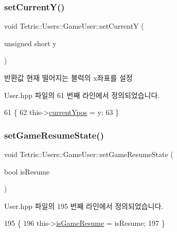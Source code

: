 \subsubsection{\texorpdfstring{set\+Current\+Y()}{setCurrentY()}\hspace{0.1cm}{\footnotesize\ttfamily [2/2]}}
{\footnotesize\ttfamily void Tetris\+::\+Users\+::\+Game\+User\+::set\+CurrentY (\begin{DoxyParamCaption}\item[{unsigned short}]{y }\end{DoxyParamCaption})\hspace{0.3cm}{\ttfamily [inline]}}

\begin{DoxyReturn}{반환값}
현재 떨어지는 블럭의 x좌표를 설정 
\end{DoxyReturn}


User.\+hpp 파일의 61 번째 라인에서 정의되었습니다.


\begin{DoxyCode}
61                                                   \{
62                     this->\hyperlink{class_tetris_1_1_users_1_1_game_user_ac1d5e4a4f73eb8502faae95d7958d83e}{currentYpos} = y;
63                 \}
\end{DoxyCode}
\mbox{\label{class_tetris_1_1_users_1_1_game_user_a10d5ff75a132346fd1947ea14bcea7ab}} 
\subsubsection{\texorpdfstring{set\+Game\+Resume\+State()}{setGameResumeState()}}
{\footnotesize\ttfamily void Tetris\+::\+Users\+::\+Game\+User\+::set\+Game\+Resume\+State (\begin{DoxyParamCaption}\item[{bool}]{is\+Resume }\end{DoxyParamCaption})\hspace{0.3cm}{\ttfamily [inline]}}



User.\+hpp 파일의 195 번째 라인에서 정의되었습니다.


\begin{DoxyCode}
195                                                   \{
196                 this->\hyperlink{class_tetris_1_1_users_1_1_game_user_a7f1389568b9af1e543a54bedd2e39ffc}{isGameResume} = isResume;
197             \}
\end{DoxyCode}
\mbox{\label{class_tetris_1_1_users_1_1_game_user_a40603ad69564036b53b99cdd67fe5451}} 
